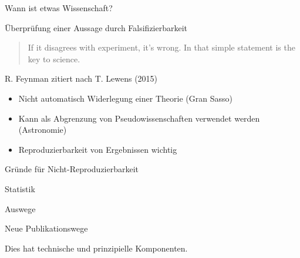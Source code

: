 \documentclass{beamer}
\begin{document}
\begin{frame}{Wann ist etwas Wissenschaft?}

    Überprüfung einer Aussage durch Falsifizierbarkeit
    \begin{quote}
        If it disagrees with experiment, it's wrong. In that simple statement is
        the key to science.
    \end{quote}

    {\ft\hfill R. Feynman zitiert nach T. Lewens (2015)}

    \vspace{1cm}

    \begin{itemize}
        \item Nicht automatisch Widerlegung einer Theorie (Gran Sasso)
        \item Kann als Abgrenzung von Pseudowissenschaften verwendet werden
            (Astronomie)
        \item Reproduzierbarkeit von Ergebnissen wichtig
    \end{itemize}

\end{frame}

\begin{frame}{Gründe für Nicht-Reproduzierbarkeit}

\end{frame}

\begin{frame}{Statistik}

\end{frame}

\begin{frame}{Auswege}

\end{frame}

\begin{frame}{Neue Publikationswege}

    Dies hat technische und prinzipielle Komponenten.

\end{frame}
\end{document}
